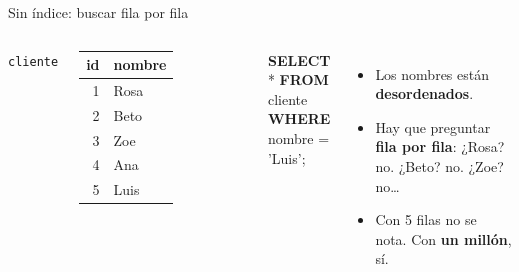 \documentclass[aspectratio=169,10pt,c]{beamer}
\newcommand{\tbl}[1]{\textcolor{utpNaranja}{\texttt{#1}}}
\newcommand{\kw}[1]{\textcolor{utpRojo}{\textbf{#1}}}
\newenvironment{sqlcode}[1][.86\textwidth]
  {\begin{center}\begin{lrbox}{\sqlbuf}\begin{minipage}{#1}\ttfamily\footnotesize\vspace{6pt}\raggedright}
  {\vspace{6pt}\end{minipage}\end{lrbox}\colorbox{utpGrisClaro}{\usebox{\sqlbuf}}\end{center}}
\newcommand{\cab}[1]{\normalfont\bfseries #1}
\begin{document}
\begin{frame}{Sin índice: buscar fila por fila}
\begin{columns}[c,onlytextwidth]
\centering\tbl{cliente}\\[4pt]
\scriptsize\ttfamily
\begin{tabular}{rl}
\toprule
\cab{id} & \cab{nombre} \\
\midrule
1 & Rosa \\
2 & Beto \\
3 & Zoe \\
4 & Ana \\
5 & Luis \\
\bottomrule
\end{tabular}
\begin{sqlcode}[\textwidth]
\scriptsize
\kw{SELECT} * \kw{FROM} cliente\\
\kw{WHERE} nombre = 'Luis';
\end{sqlcode}
\vspace{-0.1cm}
\small
\begin{itemize}\setlength\itemsep{6pt}
  \item Los nombres están \textbf{desordenados}.
  \item Hay que preguntar \textbf{fila por fila}: ¿Rosa? no. ¿Beto? no. ¿Zoe? no\ldots
  \item Con 5 filas no se nota. Con \textbf{un millón}, sí.
\end{itemize}
\end{columns}
\vspace{0.5cm}
\end{frame}
\end{document}
